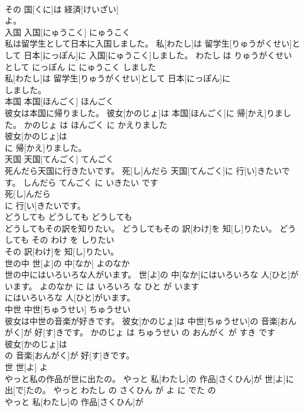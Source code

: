 \documentclass[8pt]{extreport}
\begin{document}
\begin{CJK}{UTF8}{min}
\\	その 国[くに]は 経済[けいざい]
\\	よ。			
\\	入国	入国[にゅうこく]	にゅうこく	
\\	私は留学生として日本に入国しました。	私[わたし]は 留学生[りゅうがくせい]として 日本[にっぽん]に 入国[にゅうこく]しました。	わたし は りゅうがくせい として にっぽん に にゅうこく しました	
\\	私[わたし]は 留学生[りゅうがくせい]として 日本[にっぽん]に
\\	しました。			
\\	本国	本国[ほんごく]	ほんごく	
\\	彼女は本国に帰りました。	彼女[かのじょ]は 本国[ほんごく]に 帰[かえ]りました。	かのじょ は ほんごく に かえりました	
\\	彼女[かのじょ]は
\\	に 帰[かえ]りました。			
\\	天国	天国[てんごく]	てんごく	
\\	死んだら天国に行きたいです。	死[し]んだら 天国[てんごく]に 行[い]きたいです。	しんだら てんごく に いきたい です	
\\	死[し]んだら
\\	に 行[い]きたいです。			
\\	どうしても	どうしても	どうしても	
\\	どうしてもその訳を知りたい。	どうしてもその 訳[わけ]を 知[し]りたい。	どうしても その わけ を しりたい	
\\	その 訳[わけ]を 知[し]りたい。			
\\	世の中	世[よ]の 中[なか]	よのなか	
\\	世の中にはいろいろな人がいます。	世[よ]の 中[なか]にはいろいろな 人[ひと]がいます。	よのなか に は いろいろ な ひと が います	
\\	にはいろいろな 人[ひと]がいます。			
\\	中世	中世[ちゅうせい]	ちゅうせい	
\\	彼女は中世の音楽が好きです。	彼女[かのじょ]は 中世[ちゅうせい]の 音楽[おんがく]が 好[す]きです。	かのじょ は ちゅうせい の おんがく が すき です	
\\	彼女[かのじょ]は
\\	の 音楽[おんがく]が 好[す]きです。			
\\	世	世[よ]	よ	
\\	やっと私の作品が世に出たの。	やっと 私[わたし]の 作品[さくひん]が 世[よ]に 出[で]たの。	やっと わたし の さくひん が よ に でた の	
\\	やっと 私[わたし]の 作品[さくひん]が

\end{CJK}
\end{document}
